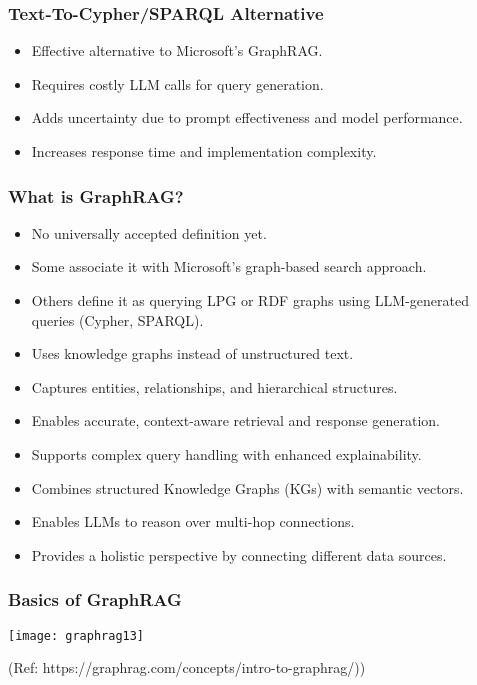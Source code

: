 \begin{frame}[fragile]\frametitle{Text-To-Cypher/SPARQL Alternative}
    \begin{itemize}
        \item Effective alternative to Microsoft's GraphRAG.
        \item Requires costly LLM calls for query generation.
        \item Adds uncertainty due to prompt effectiveness and model performance.
        \item Increases response time and implementation complexity.
    \end{itemize}
\end{frame}

\begin{frame}[fragile]\frametitle{What is GraphRAG?}
    \begin{itemize}
        \item No universally accepted definition yet.
        \item Some associate it with Microsoft's graph-based search approach.
        \item Others define it as querying LPG or RDF graphs using LLM-generated queries (Cypher, SPARQL).	
        \item Uses knowledge graphs instead of unstructured text.
        \item Captures entities, relationships, and hierarchical structures.
        \item Enables accurate, context-aware retrieval and response generation.
        \item Supports complex query handling with enhanced explainability.
        \item Combines structured Knowledge Graphs (KGs) with semantic vectors.
        \item Enables LLMs to reason over multi-hop connections.
        \item Provides a holistic perspective by connecting different data sources.		
    \end{itemize}
\end{frame}

\begin{frame}[fragile]\frametitle{Basics of GraphRAG }

	\begin{center}
	\texttt{[image: graphrag13]}
	\end{center}
	
		{\tiny (Ref: https://graphrag.com/concepts/intro-to-graphrag/))}

	
\end{frame}


